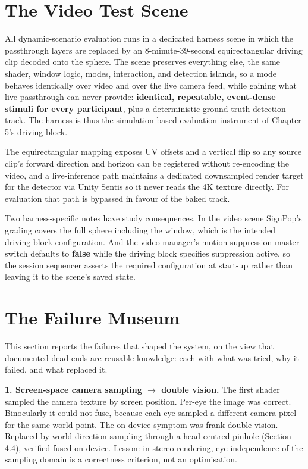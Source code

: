 \section{The Video Test Scene}

All dynamic-scenario evaluation runs in a dedicated harness scene in which the passthrough layers are
replaced by an 8-minute-39-second equirectangular driving clip decoded onto the sphere. The scene
preserves everything else, the same shader, window logic, modes, interaction, and detection islands,
so a mode behaves identically over video and over the live camera feed, while gaining what live
passthrough can never provide: \textbf{identical, repeatable, event-dense stimuli for every
participant}, plus a deterministic ground-truth detection track. The harness is thus the
simulation-based evaluation instrument of Chapter 5's driving block.

The equirectangular mapping exposes UV offsets and a vertical flip so any source clip's forward
direction and horizon can be registered without re-encoding the video, and a live-inference path
maintains a dedicated downsampled render target for the detector via Unity Sentis \citep{unity2024}
so it never reads the 4K texture directly. For evaluation that path is bypassed in favour of the
baked track.

Two harness-specific notes have study consequences. In the video scene SignPop's grading covers the
full sphere including the window, which is the intended driving-block configuration. And the video
manager's motion-suppression master switch defaults to \textbf{false} while the driving block
specifies suppression active, so the session sequencer asserts the required configuration at start-up
rather than leaving it to the scene's saved state.

\section{The Failure Museum}

This section reports the failures that shaped the system, on the view that documented dead ends are
reusable knowledge: each with what was tried, why it failed, and what replaced it.

\textbf{1. Screen-space camera sampling $\rightarrow$ double vision.} The first shader sampled the
camera texture by screen position. Per-eye the image was correct. Binocularly it could not fuse,
because each eye sampled a different camera pixel for the same world point. The on-device symptom was
frank double vision. Replaced by world-direction sampling through a head-centred pinhole
(Section 4.4), verified fused on device. Lesson: in stereo rendering, eye-independence of the
sampling domain is a correctness criterion, not an optimisation.

